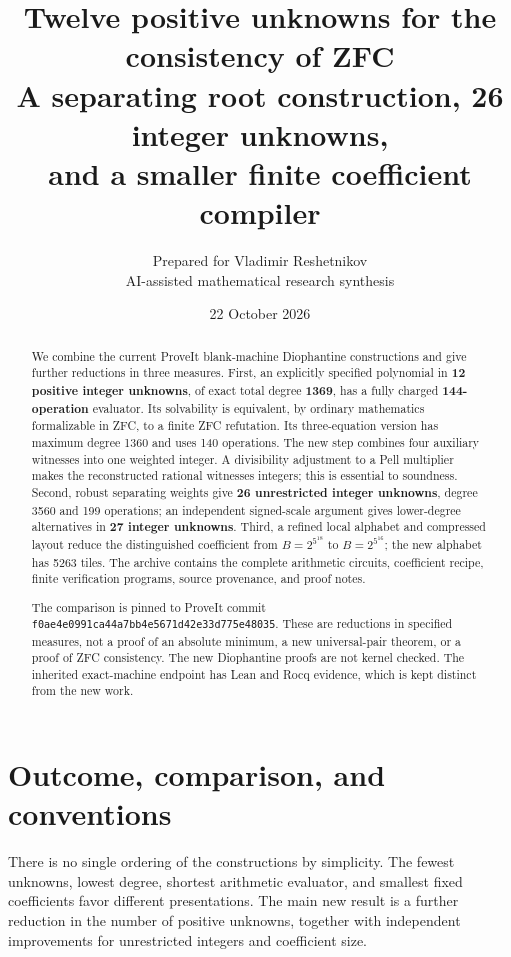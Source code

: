 \documentclass[11pt]{article}
\title{\textbf{Twelve positive unknowns for the consistency of ZFC}\\[6pt]
\large A separating root construction, 26 integer unknowns,\\and a smaller finite coefficient compiler}
\author{Prepared for Vladimir Reshetnikov\\\small AI-assisted mathematical research synthesis}
\date{22 October 2026}
\newcommand{\src}[1]{\nolinkurl{#1}}
\theoremstyle{remark}\newtheorem{remark}[theorem]{Remark}
\begin{document}
\maketitle
\begin{abstract}
We combine the current ProveIt blank-machine Diophantine constructions and
give further reductions in three measures. First, an explicitly specified polynomial in
\textbf{12 positive integer unknowns}, of exact total degree \textbf{1369},
has a fully charged \textbf{144-operation} evaluator. Its solvability is
equivalent, by ordinary mathematics formalizable in ZFC, to a finite ZFC
refutation. Its three-equation version has maximum degree 1360 and uses
140 operations. The new step combines four auxiliary witnesses into one
weighted integer. A divisibility adjustment to a Pell multiplier makes the
reconstructed rational witnesses integers; this is essential to soundness.
Second, robust separating weights give \textbf{26 unrestricted integer
unknowns}, degree 3560 and 199 operations; an independent signed-scale
argument gives lower-degree alternatives in \textbf{27 integer unknowns}.
Third, a refined local alphabet
and compressed layout reduce the distinguished coefficient from
$B=2^{5^{18}}$ to \textbf{$B=2^{5^{16}}$}; the new alphabet has 5263 tiles.
The archive contains the complete arithmetic circuits, coefficient recipe,
finite verification programs, source provenance, and proof notes.

The comparison is pinned to ProveIt commit
\src{f0ae4e0991ca44a7bb4e5671d42e33d775e48035}.
These are reductions in specified measures, not a proof of an absolute
minimum, a new universal-pair theorem, or a proof of ZFC consistency.
The new Diophantine proofs are not kernel checked. The inherited exact-machine
endpoint has Lean and Rocq evidence, which is kept distinct from the new work.
\end{abstract}
\clearpage
\tableofcontents
\clearpage

\section{Outcome, comparison, and conventions}\label{sec:results}

There is no single ordering of the constructions by simplicity. The fewest
unknowns, lowest degree, shortest arithmetic evaluator, and smallest fixed
coefficients favor different presentations. The main new result is a further
reduction in the number of positive unknowns, together with independent
improvements for unrestricted integers and coefficient size.
\end{document}
